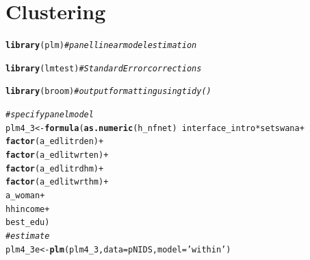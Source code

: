 \documentclass[a4paper,british]{article}\usepackage[]{graphicx}\usepackage[]{color}
\makeatletter
\newcommand{\hlstr}[1]{\textcolor[rgb]{0.192,0.494,0.8}{#1}}%
\newcommand{\hlcom}[1]{\textcolor[rgb]{0.678,0.584,0.686}{\textit{#1}}}%
\newcommand{\hlopt}[1]{\textcolor[rgb]{0,0,0}{#1}}%
\newcommand{\hlstd}[1]{\textcolor[rgb]{0.345,0.345,0.345}{#1}}%
\newcommand{\hlkwb}[1]{\textcolor[rgb]{0.69,0.353,0.396}{#1}}%
\newcommand{\hlkwc}[1]{\textcolor[rgb]{0.333,0.667,0.333}{#1}}%
\newcommand{\hlkwd}[1]{\textcolor[rgb]{0.737,0.353,0.396}{\textbf{#1}}}%
\newenvironment{kframe}{%
 \def\at@end@of@kframe{}%
 \ifinner\ifhmode%
  \def\at@end@of@kframe{\end{minipage}}%
  \begin{minipage}{\columnwidth}%
 \fi\fi%
 \def\FrameCommand##1{\hskip\@totalleftmargin \hskip-\fboxsep
 \colorbox{shadecolor}{##1}\hskip-\fboxsep
     \hskip-\linewidth \hskip-\@totalleftmargin \hskip\columnwidth}%
 \MakeFramed {\advance\hsize-\width
   \@totalleftmargin\z@ \linewidth\hsize
   \@setminipage}}%
 {\par\unskip\endMakeFramed%
 \at@end@of@kframe}
\newenvironment{knitrout}{}{} %
\makeatother
\begin{document}
\newpage{}

\printbibliography

\newpage{}

\section{Clustering}

\begin{table}[H]
\caption{Clustering}

\begin{knitrout}
\color{fgcolor}\begin{kframe}
\begin{alltt}
\hlkwd{library}\hlstd{(plm)}    \hlcom{# panel linear model estimation}
\end{alltt}


{\ttfamily\noindent\itshape\color{messagecolor}{\#\# Loading required package: Formula}}

{\ttfamily\noindent\itshape\color{messagecolor}{\#\# \\\#\# Attaching package: 'plm'}}

{\ttfamily\noindent\itshape\color{messagecolor}{\#\# The following object is masked from 'package:dplyr':\\\#\# \\\#\#\ \ \ \  between}}\begin{alltt}
\hlkwd{library}\hlstd{(lmtest)} \hlcom{# Standard Error corrections}
\end{alltt}


{\ttfamily\noindent\itshape\color{messagecolor}{\#\# Loading required package: zoo}}

{\ttfamily\noindent\itshape\color{messagecolor}{\#\# \\\#\# Attaching package: 'zoo'}}

{\ttfamily\noindent\itshape\color{messagecolor}{\#\# The following objects are masked from 'package:base':\\\#\# \\\#\#\ \ \ \  as.Date, as.Date.numeric}}\begin{alltt}
\hlkwd{library}\hlstd{(broom)}  \hlcom{# output formatting using tidy()}

\hlcom{# specify panel model}
\hlstd{plm4_3} \hlkwb{<-} \hlkwd{formula}\hlstd{(}\hlkwd{as.numeric}\hlstd{(h_nfnet)}  \hlopt{~} \hlstd{interface_intro}\hlopt{*}\hlstd{setswana}  \hlopt{+}
                                         \hlkwd{factor}\hlstd{(a_edlitrden)}  \hlopt{+}
                                         \hlkwd{factor}\hlstd{(a_edlitwrten)} \hlopt{+}
                                         \hlkwd{factor}\hlstd{(a_edlitrdhm)}  \hlopt{+}
                                         \hlkwd{factor}\hlstd{(a_edlitwrthm)} \hlopt{+}
                                         \hlstd{a_woman}              \hlopt{+}
                                         \hlstd{hhincome}             \hlopt{+}
                                         \hlstd{best_edu              )}
\hlcom{# estimate}
\hlstd{plm4_3e} \hlkwb{<-} \hlkwd{plm}\hlstd{(plm4_3,} \hlkwc{data}\hlstd{=pNIDS,} \hlkwc{model}\hlstd{=}\hlstr{'within'}\hlstd{)}


\end{alltt}
\end{kframe}
\end{knitrout}
\end{table}
\end{document}
